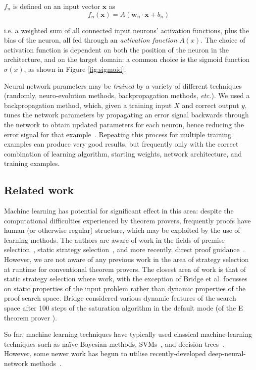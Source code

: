\documentclass{llncs}
\begin{document}
\(f_n\) is defined on an input vector \(\textbf{x}\) as
\[
	f_n(\textbf{x}) = A\left(\textbf{w}_n\cdot\textbf{x} + b_n\right)
\]

i.e. a weighted sum of all connected input neurons' activation functions, plus the bias of the neuron, all fed through an \emph{activation function} \(A(x)\).
The choice of activation function is dependent on both the position of the neuron in the architecture, and on the target domain: a common choice is the sigmoid function \(\sigma(x)\), as shown in Figure \ref{fig:sigmoid}.

Neural network parameters may be \emph{trained} by a variety of different techniques (randomly, neuro-evolution methods, backpropagation methods, \emph{etc.}).
We used a backpropagation method, which, given a training input \(X\) and correct output \(y\), tunes the network parameters by propagating an error signal backwards through the network to obtain updated parameters for each neuron, hence reducing the error signal for that example~\cite{backpropagation}.
Repeating this process for multiple training examples can produce very good results, but frequently only with the correct combination of learning algorithm, starting weights, network architecture, and training examples.

\subsection{Related work}
Machine learning has potential for significant effect in this area: despite the computational difficulties experienced by theorem provers, frequently proofs have human (or otherwise regular) structure, which may be exploited by the use of learning methods.
The authors are aware of work in the fields of premise selection~\cite{deepmath, mash, malarea, deep-graph-embedding}, static strategy selection~\cite{bridge, males, e-males}, and more recently, direct proof guidance~\cite{malecop, femalecop, deep-proof-search}.
However, we are not aware of any previous work in the area of strategy selection at runtime for conventional theorem provers. The closest area of work is that of static strategy selection where work, with the exception of Bridge et al. \cite{bridge} focusses on static properties of the input problem rather than dynamic properties of the proof search space. Bridge considered various dynamic features of the search space after 100 steps of the saturation algorithm in the default mode (of the E theorem prover \cite{E}).

So far, machine learning techniques have typically used classical machine-learning techniques such as na\"ive Bayesian methods, SVMs~\cite{svm}, and decision trees~\cite{decision-tree}.
However, some newer work has begun to utilise recently-developed deep-neural-network methods~\cite{deepmath, deep-graph-embedding, deep-proof-search}.
\end{document}
